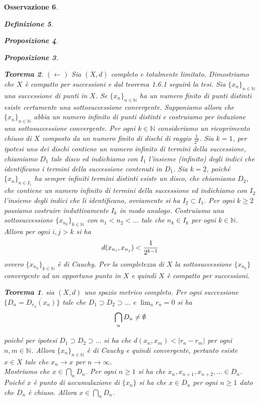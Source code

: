 \documentclass[oneside, 11pt]{amsbook}
\makeatletter
\newcommand{\0}{{(0)}}
\newcommand{\3}{{(3)}}
\theoremstyle{colonplain}
\newtheorem{thm}{Teorema}[chapter]
\newtheorem{prop}[thm]{Proposizione}
\theoremstyle{colondefinition}
\newtheorem{defn}[thm]{Definizione}
\theoremstyle{colonremark}
\newtheorem{rmk}[thm]{Osservazione}
\numberwithin{equation}{chapter}
\renewcommand{\proofname}{Dimostrazione}
\renewenvironment{proof}[1][\proofname]{\par
  \pushQED{\end{proof}}%
  \normalfont \topsep6\p@\@plus6\p@\relax
  \trivlist
  \item[\hskip\labelsep\bfseries #1:]\ignorespaces
}{%
  \popQED\endtrivlist\@endpefalse
}
\makeatother
\begin{document}
\begin{rmk}
\begin{defn}
\begin{prop}
\begin{prop}
\begin{thm}
\begin{proof}
$(\leftarrow)$ Sia $(X, d)$ completo e totalmente limitato. Dimostriamo che $X$ è compatto per successioni e dal \textit{teorema 1.6.1} seguirà la tesi. Sia $\{x_n\}_{n \in \mathbb{N}}$ una successione di punti in $X$. Se $\{x_n\}_{n \in \mathbb{N}}$ ha un numero finito di punti distinti esiste certamente una sottosuccessione convergente. Supponiamo allora che $\{x_n\}_{n \in \mathbb{N}}$ abbia un numero infinito di punti distinti e costruiamo per induzione una sottosuccessione convergente. Per ogni $k \in \mathbb{N}$ consideriamo un ricoprimento chiuso di $X$ composto da un numero finito di dischi di raggio $\frac{1}{2^k}$. Sia $k = 1$, per ipotesi uno dei dischi contiene un numero infinito di termini della successione, chiamiamo $D_1$ tale disco ed indichiamo con $I_1$ l'insieme (infinito) degli indici che identificano i termini della successione contenuti in $D_1$. Sia $k = 2$, poiché $\{x_n\}_{n \in I_1}$ ha sempre infiniti termini distinti esiste un disco, che chiamiamo $D_2$, che contiene un numero infinito di termini della successione ed indichiamo con $I_2$ l'insieme degli indici che li identificano, ovviamente si ha $I_2 \subset I_1$. Per ogni $k \geq 2$ possiamo costruire induttivamente $I_k$ in modo analogo. Costruiamo una sottosuccessione $\{x_{n_k}\}_{k \in \mathbb{N}}$ con $n_1 < n_2 < \dots$ tale che $n_k \in I_k$ per ogni $k \in \mathbb{N}$. Allora per ogni $i, j > k$ si ha 
\begin{align}
    d(x_{n_i}, x_{n_j}) < \frac{1}{2^{k - 1}} \notag
\end{align}
ovvero $\{x_{n_k}\}_{k \in \mathbb{N}}$ è di Cauchy. Per la completezza di $X$ la sottosuccessione $\{x_{n_k}\}$ convergente ad un opportuno punto in $X$ e quindi $X$ è compatto per successioni.
\end{proof}
\begin{thm}
sia $(X, d)$ uno spazio metrico completo. Per ogni successione $\{D_n = \overline{{D}_{r_n}(x_n)}\}$ tale che $D_1 \supset D_2 \supset \dots$ e $\lim_n r_n = 0$ si ha 
\begin{align}
    \bigcap_{n}D_n \neq \emptyset \notag
\end{align}
\begin{proof}
poiché per ipotesi $D_1 \supset D_2 \supset \dots$ si ha che $d(x_n, x_m) < |r_n - r_m|$ per ogni $n, m \in \mathbb{N}$. Allora $\{x_n\}_{n \in \mathbb{N}}$ è di Cauchy e quindi convergente, pertanto esiste $x \in X$ tale che $x_n \rightarrow x$ per $n \rightarrow \infty$. \\
Mostriamo che $x \in \bigcap_n D_n$. Per ogni $n \geq 1$ si ha che $x_n, x_{n + 1}, x_{n + 2}, \dots \in D_n$. Poiché $x$ è punto di accumulazione di $\{x_n\}$ si ha che $x \in D_n$ per ogni $n \geq 1$ dato che $D_n$ è chiuso. Allora $x \in \bigcap_n D_n$. 
\end{proof}


\end{thm}
\end{thm}
\end{prop}
\end{prop}
\end{defn}
\end{rmk}
\end{document}
